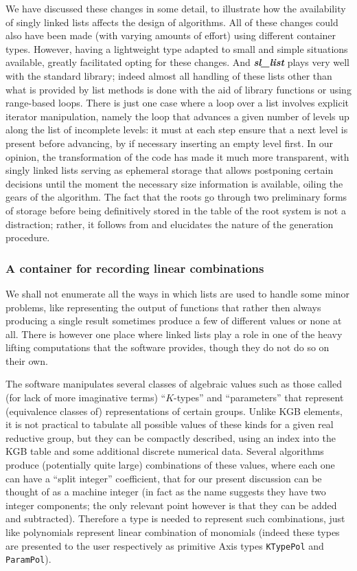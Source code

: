 \documentclass[12pt]{article}
\theoremstyle{plain}
\theoremstyle{definition}
\def\slls.{\textbf{\textit{sl\_\!list}}}
\begin{document}
We have discussed these changes in some detail, to illustrate how the
availability of singly linked lists affects the design of algorithms. All of
these changes could also have been made (with varying amounts of effort) using
different container types. However, having a lightweight type adapted to small
and simple situations available, greatly facilitated opting for these changes.
And \slls. plays very well with the standard library; indeed almost all handling
of these lists other than what is provided by list methods is done with the aid
of library functions or using range-based loops. There is just one case where a
loop over a list involves explicit iterator manipulation, namely the loop that
advances a given number of levels up along the list of incomplete levels: it
must at each step ensure that a next level is present before advancing, by if
necessary inserting an empty level first. In our opinion, the transformation of
the code has made it much more transparent, with singly linked lists serving as
ephemeral storage that allows postponing certain decisions until the moment the
necessary size information is available, oiling the gears of the algorithm. The
fact that the roots go through two preliminary forms of storage before being
definitively stored in the table of the root system is not a distraction;
rather, it follows from and elucidates the nature of the generation procedure.

\subsubsection{A container for recording linear combinations}

We shall not enumerate all the ways in which lists are used to handle some minor
problems, like representing the output of functions that rather then always
producing a single result sometimes produce a few of different values or none at
all. There is however one place where linked lists play a role in one of the
heavy lifting computations that the software provides, though they do not do so
on their own.

The software manipulates several classes of algebraic values such as those
called (for lack of more imaginative terms) ``$K$-types'' and ``parameters''
that represent (equivalence classes of) representations of certain groups.
Unlike KGB elements, it is not practical to tabulate all possible values of
these kinds for a given real reductive group, but they can be compactly
described, using an index into the KGB table and some additional discrete
numerical data. Several algorithms produce (potentially quite large)
combinations of these values, where each one can have a ``split integer''
coefficient, that for our present discussion can be thought of as a machine
integer (in fact as the name suggests they have two integer components; the
only relevant point however is that they can be added and subtracted). Therefore
a type is needed to represent such combinations, just like polynomials represent
linear combination of monomials (indeed these types are presented to the user
respectively as primitive Axis types \texttt{KTypePol} and \texttt{ParamPol}).
\end{document}
